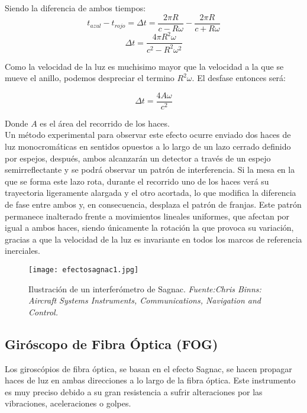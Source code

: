 Siendo la diferencia de ambos tiempos:
\[
t_{azul} - t_{rojo} = \Delta t = \frac{2\pi R}{c - R\omega} - \frac{2\pi R}{c + R\omega}
\]
\begin{equation}
\Delta t = \frac{4 \pi R^{2} \omega}{c^{2} - R^{2} \omega^{2}}
\end{equation}

Como la velocidad de la luz es muchisimo mayor que la velocidad a la que se mueve el anillo, podemos despreciar el termino \(R^{2} \omega\). El desfase entonces será:
\begin{definicion}
\begin{equation}
\Delta t = \frac{4A\omega}{c^2}
\end{equation}
\end{definicion}

Donde \(A\) es el área del recorrido de los haces.\\

Un método experimental para observar este efecto ocurre enviado dos haces de luz monocromáticas en sentidos opuestos a lo largo de un lazo cerrado definido por espejos, después, ambos alcanzarán un detector a través de un espejo semirreflectante y se podrá observar un patrón de interferencia. Si la mesa en la que se forma este lazo rota, durante el recorrido uno de los haces verá su trayectoria ligeramente alargada y el otro acortada, lo que modifica la diferencia de fase entre ambos y, en consecuencia, desplaza el patrón de franjas. Este patrón permanece inalterado frente a movimientos lineales uniformes, que afectan por igual a ambos haces, siendo únicamente la rotación la que provoca su variación, gracias a que la velocidad de la luz es invariante en todos los marcos de referencia inerciales.


\begin{figure}[H]
    \centering
    \texttt{[image: efectosagnac1.jpg]}
    \caption{\centering Ilustración de un interferómetro de Sagnac.\textit{ Fuente:Chris Binns: Aircraft Systems Instruments, Communications, Navigation and Control.}}
    \label{fig:cabes}
\end{figure}


\subsection{Giróscopo de Fibra Óptica (FOG)}
Los giroscópios de fibra óptica, se basan en el efecto Sagnac, se hacen propagar haces de luz en ambas direcciones a lo largo de la fibra óptica.  Este instrumento es muy preciso debido a su gran resistencia a sufrir alteraciones por las vibraciones, aceleraciones o golpes. 

